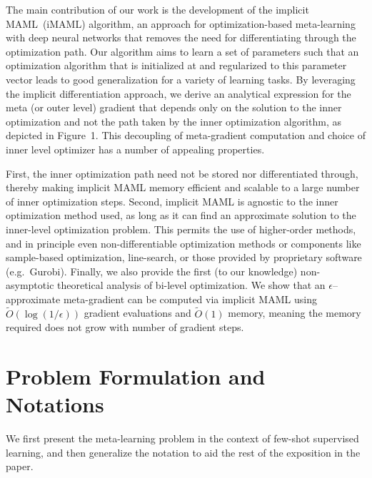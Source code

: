 \documentclass{article} \usepackage[nonatbib, final]{mod_neurips}
\begin{document}
The main contribution of our work is the development of the implicit MAML~(iMAML) algorithm, an approach for optimization-based meta-learning with deep neural networks that removes the need for differentiating through the optimization path. Our algorithm aims to learn a set of parameters such that an optimization algorithm that is initialized at and regularized to this parameter vector leads to good generalization for a variety of learning tasks. By leveraging the implicit differentiation approach, we derive an analytical expression for the meta (or outer level) gradient that depends only on the solution to the inner optimization and not the path taken by the inner optimization algorithm, as depicted in Figure~1. This decoupling of meta-gradient computation and choice of inner level optimizer has a number of appealing properties.

First, the inner optimization path need not be stored nor differentiated through, thereby making implicit MAML memory efficient and scalable to a large number of inner optimization steps. Second, implicit MAML is agnostic to the inner optimization method used, as long as it can find an approximate solution to the inner-level optimization problem. This permits the use of higher-order methods, and in principle even non-differentiable optimization methods or components like sample-based optimization, line-search, or those provided by proprietary software (e.g.~Gurobi). Finally, we also provide the first (to our knowledge) non-asymptotic theoretical analysis of bi-level optimization. We show that an $\epsilon$--approximate meta-gradient can be computed via implicit MAML using $\tilde{O}(\log(1/\epsilon))$ gradient evaluations and $\tilde{O}(1)$ memory, meaning the memory required does not grow with number of gradient steps.



 \vspace{-0.25cm}
\section{Problem Formulation and Notations}
\vspace{-0.25cm}

We first present the meta-learning problem in the context of few-shot supervised learning, and then generalize the notation to aid the rest of the exposition in the paper.

\vspace{-0.2cm}
\end{document}
